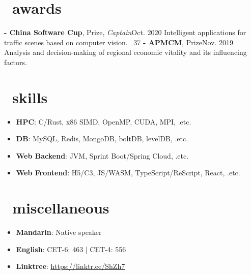 \documentclass{common}
\begin{document}
\section{\faTrophy\ awards}
\award
    {\textbf{- China Software Cup},  Prize, \textit{Captain}}{Oct. 2020}
    {Intelligent applications for traffic scenes based on computer vision. 
        {\href{https://github.com/Sh-Zh-7/intelligent-transportation-system}{\underline{\faGithub}} \faStarO\ 37}
    }
\award
    {\textbf{- APMCM},  Prize}{Nov. 2019}
    {Analysis and decision-making of regional economic vitality and its influencing factors.}

\section{\faCogs\ skills}
\begin{itemize}[parsep=0.5ex]
    \item \textbf{HPC}: C/Rust, x86 SIMD, OpenMP, CUDA, MPI, .etc.
    \item \textbf{DB}: MySQL, Redis, MongoDB, boltDB, levelDB, .etc.
    \item \textbf{Web Backend}: JVM, Sprint Boot/Spring Cloud, .etc.
    \item \textbf{Web Frontend}: H5/C3, JS/WASM, TypeScript/ReScript, React, .etc.
\end{itemize}

\section{\faInfo\ miscellaneous}
\begin{itemize}[parsep=0.5ex]
    \item \textbf{Mandarin}: Native speaker
    \item \textbf{English}: CET-6: 463 | CET-4: 556
    \item \textbf{Linktree}: \href{https://linktr.ee/ShZh7}{\underline{https://linktr.ee/ShZh7}}
\end{itemize}
\end{document}
